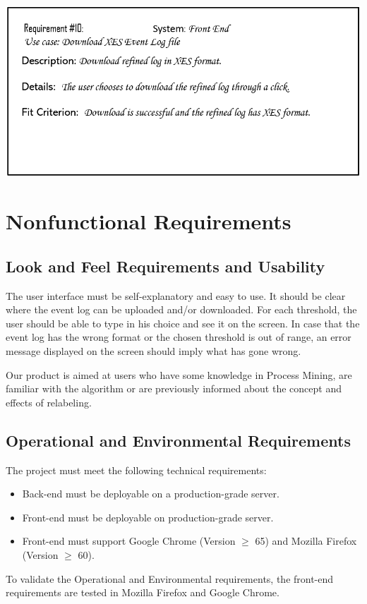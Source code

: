 \documentclass[notitlepage]{article}
\begin{document}
\begin{flushleft}
\includegraphics[scale=0.6]{reqq11.png}




\section{Nonfunctional Requirements}

\subsection{Look and Feel Requirements and Usability}
The user interface must be self-explanatory and easy to use.
It should be clear where the event log can be uploaded and/or downloaded.
For each threshold, the user should be able to type in his choice and see it on the screen.
In case that the event log has the wrong format or the chosen threshold is out of range, an error message displayed on the screen should imply what has gone wrong.

Our product is aimed at users who have some knowledge in Process Mining, are familiar with the algorithm or are previously informed about the concept and effects of relabeling.





\subsection{Operational and Environmental Requirements}
The project must meet the following technical requirements:
\medskip
\begin{itemize}
	\item Back-end must be deployable on a production-grade server.
	\item Front-end must be deployable on production-grade server.
	\item Front-end must support Google Chrome (Version $\geq$ 65) and Mozilla Firefox (Version $\geq$ 60).
\end{itemize}
\medskip
To validate the Operational and Environmental requirements, the front-end requirements are tested in Mozilla Firefox and Google Chrome. 

\end{flushleft}
\end{document}
